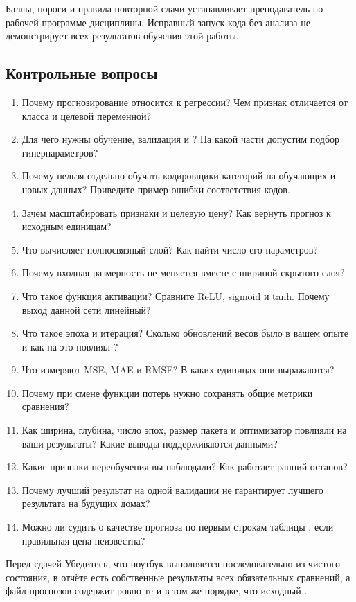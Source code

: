 Баллы, пороги и правила повторной сдачи устанавливает преподаватель
по рабочей программе дисциплины. Исправный запуск кода без анализа
не демонстрирует всех результатов обучения этой работы.

\subsection*{Контрольные вопросы}
\begin{enumerate}
\item Почему прогнозирование  относится к регрессии?
Чем признак отличается от класса и целевой переменной?
\item Для чего нужны обучение, валидация и ?
На какой части допустим подбор гиперпараметров?
\item Почему нельзя отдельно обучать кодировщики категорий на обучающих
и новых данных? Приведите пример ошибки соответствия кодов.
\item Зачем масштабировать признаки и целевую цену? Как вернуть прогноз
к исходным единицам?
\item Что вычисляет полносвязный слой? Как найти число его параметров?
\item Почему входная размерность не меняется вместе с шириной скрытого слоя?
\item Что такое функция активации? Сравните ReLU, sigmoid и tanh.
Почему выход данной сети линейный?
\item Что такое эпоха и итерация? Сколько обновлений весов было
в вашем опыте и как на это повлиял ?
\item Что измеряют MSE, MAE и RMSE? В каких единицах они выражаются?
\item Почему при смене функции потерь нужно сохранять общие метрики сравнения?
\item Как ширина, глубина, число эпох, размер пакета и оптимизатор
повлияли на ваши результаты? Какие выводы поддерживаются данными?
\item Какие признаки переобучения вы наблюдали? Как работает ранний останов?
\item Почему лучший результат на одной валидации не гарантирует
лучшего результата на будущих домах?
\item Можно ли судить о качестве прогноза по первым строкам таблицы
, если правильная цена неизвестна?
\end{enumerate}

\begin{keybox}{Перед сдачей}
Убедитесь, что ноутбук выполняется последовательно из чистого состояния,
в отчёте есть собственные результаты всех обязательных сравнений,
а файл прогнозов содержит ровно те  и в том же порядке,
что исходный .
\end{keybox}
